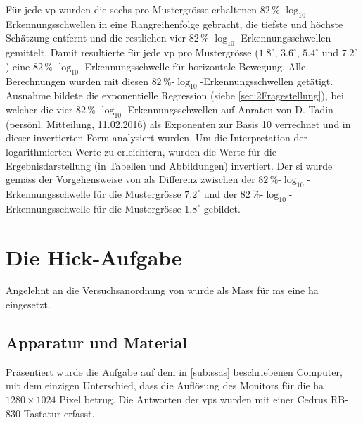 \documentclass[11pt, twoside, a4paper]{book}		%
\begin{document}
Für jede \gls{vp} wurden die sechs pro Mustergrösse erhaltenen $82\,\%$-$\log_{10}$-Er\-ken\-nungs\-schwel\-len in eine Rangreihenfolge gebracht, die tiefste und höchste Schätzung entfernt und die restlichen vier $82\,\%$-$\log_{10}$-Er\-ken\-nungs\-schwel\-len gemittelt. Damit resultierte für jede \gls{vp} pro Mustergrösse ($1.8^{\circ}$, $3.6^{\circ}$, $5.4^{\circ}$ und $7.2^{\circ}$) eine $82\,\%$-$\log_{10}$-Er\-ken\-nungs\-schwel\-le für horizontale Bewegung. 
Alle Berechnungen wurden mit diesen $82\,\%$-$\log_{10}$-Er\-ken\-nungs\-schwel\-len getätigt. 
Ausnahme bildete die exponentielle Regression (siehe \autoref{sec:2Fragestellung}), bei welcher die vier $82\,\%$-$\log_{10}$-Er\-ken\-nungs\-schwel\-len auf Anraten von D. Tadin (persönl. Mitteilung, 11.02.2016) als Exponenten zur Basis 10 verrechnet und in dieser invertierten Form analysiert wurden.
Um die Interpretation der logarithmierten Werte zu erleichtern, wurden die Werte für die Ergebnisdarstellung (in Tabellen und Abbildungen) invertiert.
Der \gls{si} wurde gemäss der Vorgehensweise von \citet{Melnick2013} als Differenz zwischen der $82\,\%$-$\log_{10}$-Er\-ken\-nungs\-schwel\-le für die Mustergrösse $7.2^{\circ}$ und der $82\,\%$-$\log_{10}$-Er\-ken\-nungs\-schwel\-le für die Mustergrösse $1.8^{\circ}$ gebildet. 


\section{Die Hick-Aufgabe \label{sec:Hick}}

Angelehnt an die Versuchsanordnung von \citet{Rammsayer2007} wurde als Mass für \gls{ms} eine \gls{ha} eingesetzt.

\subsection{Apparatur und Material \label{sub:}}
Präsentiert wurde die Aufgabe auf dem in \autoref{sub:ssas} beschriebenen Computer, mit dem einzigen Unterschied, dass die Auflösung des Monitors für die \gls{ha} $1280 \times 1024$ Pixel betrug. Die Antworten der \glspl{vp} wurden mit einer Cedrus RB-830 Tastatur erfasst. 
\end{document}
